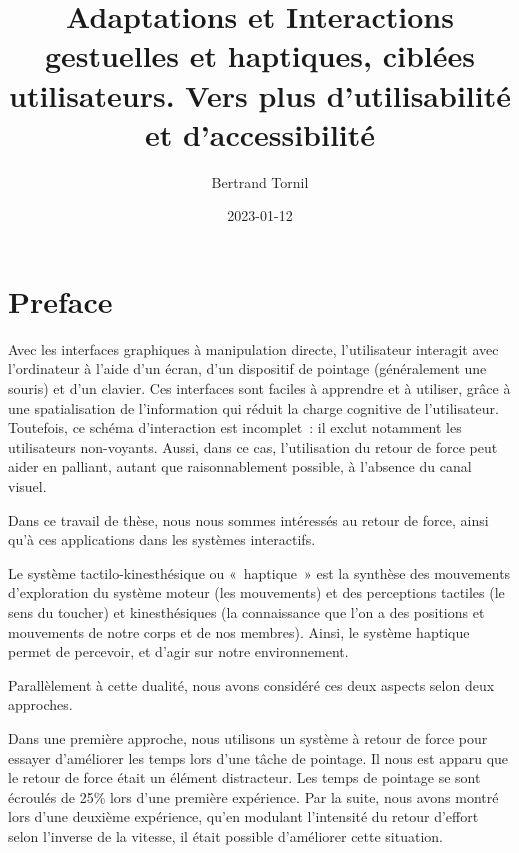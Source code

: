 \documentclass[
]{book}
\title{Adaptations et Interactions gestuelles et haptiques, ciblées utilisateurs.
Vers plus d'utilisabilité et d'accessibilité}
\author{Bertrand Tornil}
\date{2023-01-12}
\begin{document}
\maketitle

{
\setcounter{tocdepth}{1}
\tableofcontents
}
\hypertarget{preface}{%
\chapter*{Preface}\label{preface}}

Avec les interfaces graphiques à manipulation directe,
l'utilisateur interagit avec l'ordinateur à l'aide d'un écran, d'un
dispositif de pointage (généralement une souris) et d'un clavier. Ces
interfaces sont faciles à apprendre et à utiliser, grâce à une spatialisation
de l'information qui réduit la charge cognitive de l'utilisateur. Toutefois,
ce schéma d'interaction est incomplet~: il exclut notamment les utilisateurs
non-voyants. Aussi, dans ce cas, l'utilisation du retour de force peut aider
en palliant, autant que raisonnablement possible, à l'absence du canal
visuel.

Dans ce travail de thèse, nous nous sommes intéressés au retour de force,
ainsi qu'à ces applications dans les systèmes interactifs.

Le système tactilo-kinesthésique ou «~haptique~» est la synthèse des
mouvements d'exploration du système moteur (les mouvements) et des
perceptions tactiles (le sens du toucher) et kinesthésiques (la connaissance
que l'on a des positions et mouvements de notre corps et de nos membres).
Ainsi, le système haptique permet de percevoir, et d'agir sur notre
environnement.

Parallèlement à cette dualité, nous avons considéré ces deux aspects selon
deux approches.

Dans une première approche, nous utilisons un système à retour de force
pour essayer d'améliorer les temps lors d'une tâche de pointage. Il nous est
apparu que le retour de force était un élément distracteur. Les temps de
pointage se sont écroulés de 25\% lors d'une première expérience. Par la
suite, nous avons montré lors d'une deuxième expérience, qu'en modulant
l'intensité du retour d'effort selon l'inverse de la vitesse, il était
possible d'améliorer cette situation.
\end{document}
